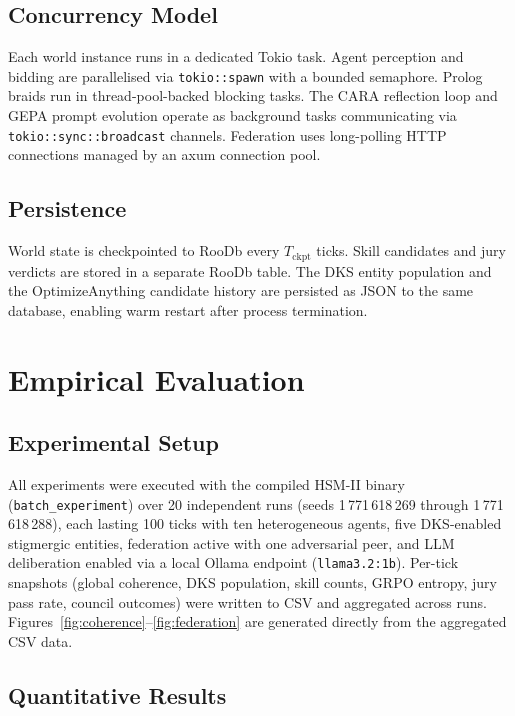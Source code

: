 \documentclass[11pt]{article}
\begin{document}
\subsection{Concurrency Model}

Each world instance runs in a dedicated Tokio task. Agent perception and bidding
are parallelised via \texttt{tokio::spawn} with a bounded semaphore. Prolog
braids run in thread-pool-backed blocking tasks. The CARA reflection loop and
GEPA prompt evolution operate as background tasks communicating via
\texttt{tokio::sync::broadcast} channels. Federation uses long-polling HTTP
connections managed by an axum connection pool.

\subsection{Persistence}

World state is checkpointed to RooDb every $T_{\text{ckpt}}$ ticks. Skill
candidates and jury verdicts are stored in a separate RooDb table. The DKS entity
population and the OptimizeAnything candidate history are persisted as JSON to
the same database, enabling warm restart after process termination.

\section{Empirical Evaluation}
\label{sec:eval}

\subsection{Experimental Setup}

All experiments were executed with the compiled HSM-II binary
(\texttt{batch\_experiment}) over 20 independent runs
(seeds 1\,771\,618\,269 through 1\,771\,618\,288), each lasting 100 ticks with
ten heterogeneous agents, five DKS-enabled stigmergic entities, federation
active with one adversarial peer, and LLM deliberation enabled via a local
Ollama endpoint (\texttt{llama3.2:1b}).
Per-tick snapshots (global coherence, DKS population, skill counts, GRPO
entropy, jury pass rate, council outcomes) were written to CSV and aggregated
across runs.
Figures~\ref{fig:coherence}--\ref{fig:federation} are generated directly from
the aggregated CSV data.

\subsection{Quantitative Results}
\end{document}
